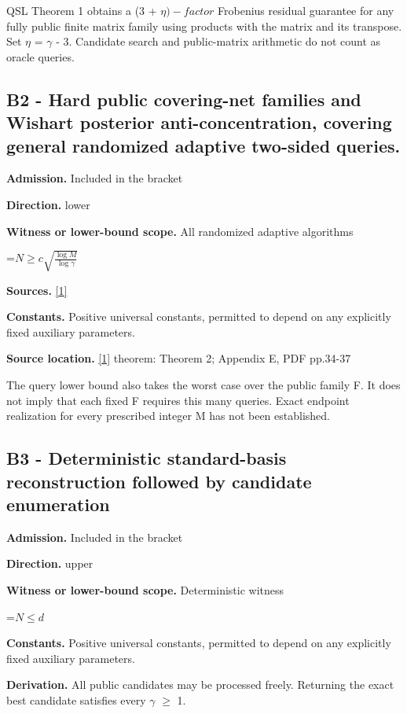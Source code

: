 \documentclass[10pt,a4paper]{article}
\newcommand{\AtlasMath}[1]{\par\begingroup\centering\setbox0=\hbox{$\displaystyle #1$}\ifdim\wd0>1.4\linewidth\typeout{ATLAS WIDE FORMULA: \the\wd0}\fi\ifdim\wd0>\linewidth\resizebox{\linewidth}{!}{\box0}\else\box0\fi\par\endgroup}
\begin{document}
QSL Theorem 1 obtains a (3 + $\eta )-factor$ Frobenius residual guarantee for any fully public finite matrix family using products with the matrix and its transpose. Set $\eta$ = $\gamma$ - 3. Candidate search and public-matrix arithmetic do not count as oracle queries.

\subsection{B2 - Hard public covering-net families and Wishart posterior anti-concentration, covering general randomized adaptive two-sided queries.}
\textbf{Admission.} Included in the bracket

\textbf{Direction.} lower

\textbf{Witness or lower-bound scope.} All randomized adaptive algorithms

\AtlasMath{N\ge c\sqrt{\frac{\log M}{\log\gamma}}}
\textbf{Sources.} \href{https://raw.githubusercontent.com/mlresearch/v336/main/assets/amsel26a/amsel26a.pdf}{[1]}

\textbf{Constants.} Positive universal constants, permitted to depend on any explicitly fixed auxiliary parameters.

\textbf{Source location.} \href{https://raw.githubusercontent.com/mlresearch/v336/main/assets/amsel26a/amsel26a.pdf}{[1]} theorem: Theorem 2; Appendix E, PDF pp.34-37

The query lower bound also takes the worst case over the public family F. It does not imply that each fixed F requires this many queries. Exact endpoint realization for every prescribed integer M has not been established.

\subsection{B3 - Deterministic standard-basis reconstruction followed by candidate enumeration}
\textbf{Admission.} Included in the bracket

\textbf{Direction.} upper

\textbf{Witness or lower-bound scope.} Deterministic witness

\AtlasMath{N\le d}
\textbf{Constants.} Positive universal constants, permitted to depend on any explicitly fixed auxiliary parameters.

\textbf{Derivation.} All public candidates may be processed freely. Returning the exact best candidate satisfies every $\gamma$ $\ge$ 1.
\end{document}

